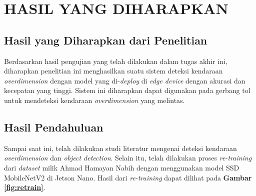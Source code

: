 \chapter{HASIL YANG DIHARAPKAN}
\label{chap:hasilyangdiharapkan}


\section{Hasil yang Diharapkan dari Penelitian}

Berdasarkan hasil pengujian yang telah dilakukan dalam tugas akhir ini, diharapkan penelitian ini menghasilkan suatu sistem deteksi kendaraan \emph{overdimension} dengan model yang di-\emph{deploy} di \emph{edge device} dengan akurasi dan kecepatan yang tinggi. Sistem ini diharapkan dapat digunakan pada gerbang tol untuk mendeteksi kendaraan \emph{overdimension} yang melintas.


\section{Hasil Pendahuluan}

Sampai saat ini, telah dilakukan studi literatur mengenai deteksi kendaraan \emph{overdimension} dan \emph{object detection}. Selain itu, telah dilakukan proses \emph{re-training} dari \emph{dataset} milik Ahmad Hamayan Nabih \parencite*{hamayan2024} dengan menggunakan model SSD MobileNetV2 di Jetson Nano. Hasil dari \emph{re-training} dapat dilihat pada \textbf{Gambar \ref{fig:retrain}}.


